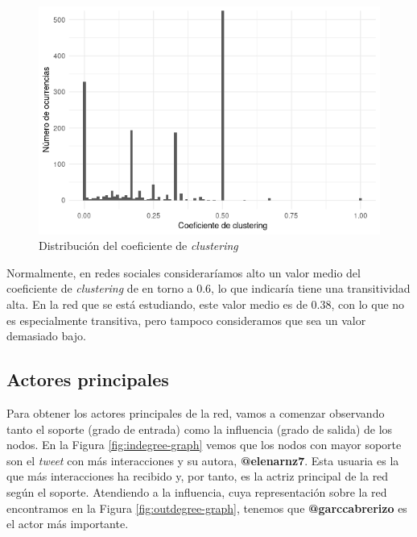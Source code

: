 \begin{figure}
    \centering
    \includegraphics[width=\textwidth]{images/plots/clustering.png}
    \caption{Distribución del coeficiente de \textit{clustering}}
    \label{fig:clustering-plot}
\end{figure}

Normalmente, en redes sociales consideraríamos alto un valor medio del
coeficiente de \textit{clustering} de en torno a 0.6, lo que indicaría tiene una
transitividad alta. En la red que se está estudiando, este valor medio es de
0.38, con lo que no es especialmente transitiva, pero tampoco consideramos que
sea un valor demasiado bajo.

\subsection{Actores principales}
\label{subsec:actors}

Para obtener los actores principales de la red, vamos a comenzar observando
tanto el soporte (grado de entrada) como la influencia (grado de salida) de los
nodos. En la Figura \ref{fig:indegree-graph} vemos que los nodos con mayor
soporte son el \textit{tweet} con más interacciones y su autora,
\textbf{@elenarnz7}. Esta usuaria es la que más interacciones ha recibido y, por
tanto, es la actriz principal de la red según el soporte. Atendiendo a la
influencia, cuya representación sobre la red encontramos en la Figura
\ref{fig:outdegree-graph}, tenemos que \textbf{@garccabrerizo} es el actor más importante.


